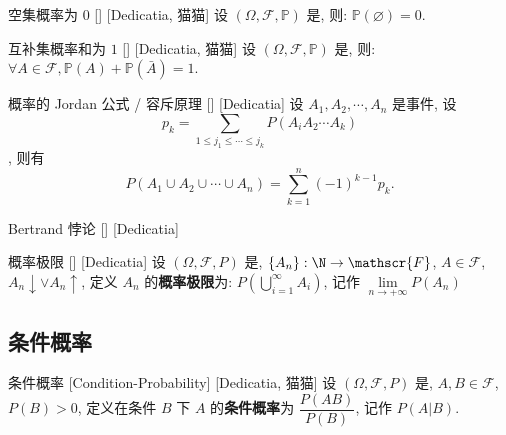 \documentclass[UTF8]{ctexart}
\begin{document}
        \begin{ppt}
            []
            {空集概率为 \(0\)}
            []
            [Dedicatia, 猫猫]
            设 \((\Omega,\mathscr{F},\mathbb{P})\) 是, 则: \(\mathbb{P}(\varnothing)=0\). 
        \end{ppt}

        \begin{ppt}
            []
            {互补集概率和为 \(1\)}
            []
            [Dedicatia, 猫猫]
            设 \((\Omega,\mathscr{F},\mathbb{P})\) 是, 则: \(\forall A\in\mathscr{F}, \mathbb{P}(A)+\mathbb{P}(\bar{A})=1\). 
        \end{ppt}

        \begin{thm}
            []
            {概率的 Jordan 公式 / 容斥原理}
            []
            [Dedicatia]
            设 \(A_1,A_2,\cdots,A_n\) 是事件, 设\[p_k=\sum_{1\leq j_1\leq\cdots\leq j_k  }P(A_i A_2\cdots A_k)\], 则有
            \[P(A_1\cup A_2\cup\cdots\cup A_n)=\sum_{k=1}^{n}(-1)^{k-1}p_k.\]
        \end{thm}

        \begin{cxmp}
            []
            {Bertrand 悖论}
            []
            [Dedicatia]
        \end{cxmp}

        \begin{dfn}
            []
            {概率极限}
            []
            [Dedicatia]
            设 \((\Omega,\mathscr{F},P)\) 是, \(\{A_n\}:\N\to\mathscr{F}\), \(A\in\mathscr{F}\), \(A_n\downarrow\lor A_n\uparrow\), 定义 \(A_n\) 的\textbf{概率极限}为: \(P\left(\bigcup\limits_{i=1}^{\infty}A_i\right)\), 记作 \(\lim\limits_{n\to+\infty}P(A_n)\)
        \end{dfn}
        

    \subsection{条件概率}

        \begin{dfn}
            {条件概率}
            [Condition-Probability]
            [Dedicatia, 猫猫]
            设 \((\Omega,\mathscr{F},P)\) 是, \(A, B\in\mathscr{F}\), \(P(B)>0\), 定义在条件 \(B\) 下 \(A\) 的\textbf{条件概率}为 \(\dfrac{P(AB)}{P(B)}\), 记作 \(P(A|B)\). 
        \end{dfn}
\end{document}
